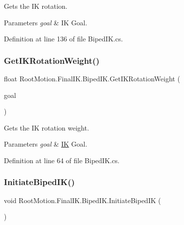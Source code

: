 Gets the IK rotation. 


\begin{DoxyParams}{Parameters}
{\em goal} & IK Goal. \\
\hline
\end{DoxyParams}


Definition at line 136 of file Biped\+I\+K.\+cs.

\mbox{\label{class_root_motion_1_1_final_i_k_1_1_biped_i_k_a5af60ad5a14d883042613e6c0297ce6a}} 
\subsubsection{\texorpdfstring{Get\+I\+K\+Rotation\+Weight()}{GetIKRotationWeight()}}
{\footnotesize\ttfamily float Root\+Motion.\+Final\+I\+K.\+Biped\+I\+K.\+Get\+I\+K\+Rotation\+Weight (\begin{DoxyParamCaption}\item[{Avatar\+I\+K\+Goal}]{goal }\end{DoxyParamCaption})}



Gets the IK rotation weight. 


\begin{DoxyParams}{Parameters}
{\em goal} & \mbox{\hyperlink{class_root_motion_1_1_final_i_k_1_1_i_k}{IK}} Goal. \\
\hline
\end{DoxyParams}


Definition at line 64 of file Biped\+I\+K.\+cs.

\mbox{\label{class_root_motion_1_1_final_i_k_1_1_biped_i_k_ac507a1f7a39259bb1620b36534e0ffa2}} 
\subsubsection{\texorpdfstring{Initiate\+Biped\+I\+K()}{InitiateBipedIK()}}
{\footnotesize\ttfamily void Root\+Motion.\+Final\+I\+K.\+Biped\+I\+K.\+Initiate\+Biped\+IK (\begin{DoxyParamCaption}{ }\end{DoxyParamCaption})}



